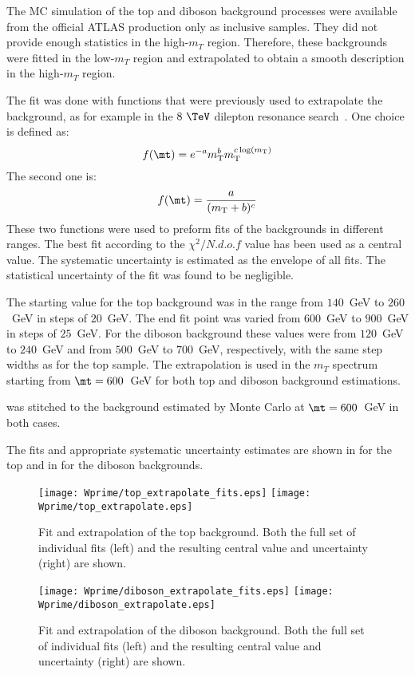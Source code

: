 The MC simulation of the top and diboson background processes were available from the official ATLAS production only as inclusive samples.
They did not provide enough statistics in the high-$m_T$ region.
Therefore, these backgrounds were fitted in the low-$m_T$ region and extrapolated to obtain a smooth description in the high-$m_T$ region.

The fit was done with functions that were previously used to extrapolate the background, as for example in the $8~\TeV$ dilepton resonance search~\cite{Aad:2014cka}.
One choice is defined as:
\begin{equation}
 f(\mt) = e^{-a} m_\mathrm{T}^{b} m_\mathrm{T}^{c \log(m_\mathrm{T})}
  \label{eq:dijetfunc}
\end{equation}
The second one is:
\begin{equation}
 f(\mt) = \frac{a}{(m_\mathrm{T}+b)^{c}}
  \label{eq:powerlaw}
\end{equation}
These two functions were used to preform fits of the backgrounds in different ranges. 
The best fit according to the $\chi^{2}/N.d.o.f$ value has been used as a central value.
The systematic uncertainty is estimated as the envelope of all fits.
The statistical uncertainty of the fit was found to be negligible.

The starting value for the top background was in the range from $140$~GeV to $260$~GeV in steps of $20$~GeV. The end fit point was varied from $600$~GeV to $900$~GeV in steps of $25$~GeV.
For the diboson background these values were from $120$~GeV to $240$~GeV and from $500$~GeV to $700$~GeV, respectively, with the same step widths as for the top sample.
The extrapolation is used in the $m_T$ spectrum starting from $\mt=600$~GeV for both top and diboson background estimations.

was stitched to the background estimated by Monte Carlo at $\mt=600$~GeV in both cases.

The fits and appropriate systematic uncertainty estimates are shown in 
 for the top and in  for the diboson backgrounds.
\begin{figure}[!htb]
  \centering
  \texttt{[image: Wprime/top\_extrapolate\_fits.eps]}
  \texttt{[image: Wprime/top\_extrapolate.eps]}
  \caption{Fit and extrapolation of the top background. Both the full set of individual
fits (left) and the resulting central value and uncertainty (right) are shown.}
  \label{fig:mu_extrapolate_top}
\end{figure}
\begin{figure}[!htb]
  \centering
  \texttt{[image: Wprime/diboson\_extrapolate\_fits.eps]}
  \texttt{[image: Wprime/diboson\_extrapolate.eps]}
  \caption{Fit and extrapolation of the diboson background. Both the full set of individual
fits (left) and the resulting central value and uncertainty (right) are shown.}
  \label{fig:mu_extrapolate_diboson}
\end{figure}

